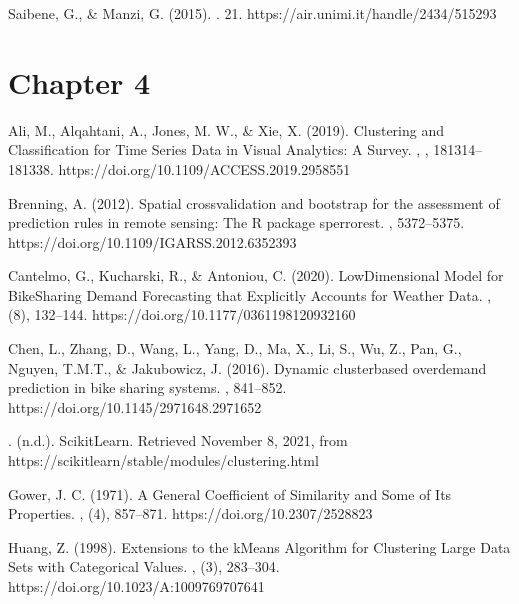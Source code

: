 \documentclass[letterpaper,10pt,english]{jupyterBook}
\begin{document}
\sphinxAtStartPar
Saibene, G., \& Manzi, G. (2015). . 21. https://air.unimi.it/handle/2434/515293


\section{Chapter 4}
\label{\detokenize{references:chapter-4}}
\sphinxAtStartPar
Ali, M., Alqahtani, A., Jones, M. W., \& Xie, X. (2019). Clustering and Classification for Time Series Data in Visual Analytics: A Survey. , , 181314–181338. https://doi.org/10.1109/ACCESS.2019.2958551

\sphinxAtStartPar
Brenning, A. (2012). Spatial cross\sphinxhyphen{}validation and bootstrap for the assessment of prediction rules in remote sensing: The R package sperrorest. , 5372–5375. https://doi.org/10.1109/IGARSS.2012.6352393

\sphinxAtStartPar
Cantelmo, G., Kucharski, R., \& Antoniou, C. (2020). Low\sphinxhyphen{}Dimensional Model for Bike\sphinxhyphen{}Sharing Demand Forecasting that Explicitly Accounts for Weather Data. , (8), 132–144. https://doi.org/10.1177/0361198120932160

\sphinxAtStartPar
Chen, L., Zhang, D., Wang, L., Yang, D., Ma, X., Li, S., Wu, Z., Pan, G., Nguyen, T.\sphinxhyphen{}M.\sphinxhyphen{}T., \& Jakubowicz, J. (2016). Dynamic cluster\sphinxhyphen{}based over\sphinxhyphen{}demand prediction in bike sharing systems. , 841–852. https://doi.org/10.1145/2971648.2971652

\sphinxAtStartPar
{}. (n.d.). Scikit\sphinxhyphen{}Learn. Retrieved November 8, 2021, from https://scikit\sphinxhyphen{}learn/stable/modules/clustering.html

\sphinxAtStartPar
Gower, J. C. (1971). A General Coefficient of Similarity and Some of Its Properties. , (4), 857–871. https://doi.org/10.2307/2528823

\sphinxAtStartPar
Huang, Z. (1998). Extensions to the k\sphinxhyphen{}Means Algorithm for Clustering Large Data Sets with Categorical Values. , (3), 283–304. https://doi.org/10.1023/A:1009769707641
\end{document}
